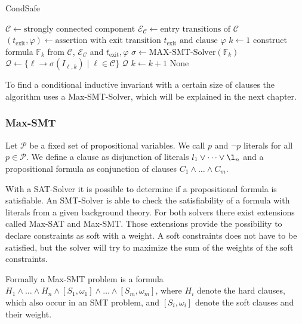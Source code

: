 \begin{algorithm}
\caption{CondSafe}\label{condsafe}
\begin{algorithmic}[1]
\State $\mathcal{C} \gets \text{strongly connected component}$
\State $\mathcal{E}_\mathcal{C} \gets \text{entry transitions of } \mathcal{C}$
\State $(t_\text{exit}, \varphi) \gets \text{assertion with exit transition } t_\text{exit} \text{ and clause } \varphi$
\State $k \gets 1$
\Repeat
  \State construct formula $\mathbb{F}_k$ from $\mathcal{C}$, $\mathcal{E}_\mathcal{C}$ and $t_\text{exit}, \varphi$
  \State $\sigma \gets \text{MAX-SMT-Solver}(\mathbb{F}_k)$
    \State $\mathcal{Q} \gets \lbrace \ell \rightarrow \sigma(I_{\ell, k}) \mid \ell \in \mathcal{C} \rbrace$
    \Return $\mathcal{Q}$
  \EndIf
  \State $k \gets k + 1$
\Return None
\end{algorithmic}
\end{algorithm}

To find a conditional inductive invariant with a certain size of clauses the algorithm uses a Max-SMT-Solver, which will be explained in the next chapter.

\subsubsection{Max-SMT}

Let $\mathcal{P}$ be a fixed set of propositional variables.
We call $p$ and $\neg p$ literals for all $p \in \mathcal{P}$.
We define a clause as disjunction of literals $l_1 \vee \dots \vee \l_n$ and a propositional formula as conjunction of clauses $C_1 \wedge \dots \wedge C_m$.

With a SAT-Solver it is possible to determine if a propositional formula is satisfiable.
An SMT-Solver is able to check the satisfiability of a formula with literals from a given background theory.
For both solvers there exist extensions called Max-SAT and Max-SMT.
Those extensions provide the possibility to declare constraints as soft with a weight.
A soft constraints does not have to be satisfied, but the solver will try to maximize the sum of the weights of the soft constraints.

Formally a Max-SMT problem is a formula $H_1 \wedge \dots \wedge H_n \wedge [S_1,\omega_1] \wedge \dots \wedge [S_m,\omega_m]$, where $H_i$ denote the hard clauses, which also occur in an SMT problem, and $[S_i,\omega_i]$ denote the soft clauses and their weight.

